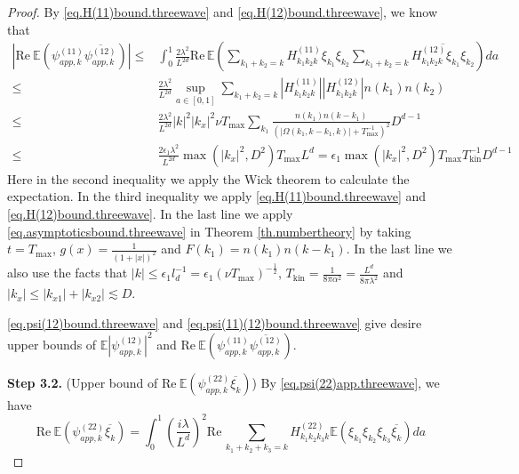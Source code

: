 \begin{proof}
By \eqref{eq.H(11)bound.threewave} and \eqref{eq.H(12)bound.threewave}, we know that 
\begin{equation}\label{eq.psi(11)(12)bound.threewave}
\begin{split}
    \left|\text{Re}\ \mathbb E \left(\psi^{(11)}_{app,k}\overline{\psi^{(12)}_{app,k}}\right)\right|
    \le& \int^1_{0}\frac{2\lambda^2}{L^{2d}} \text{Re}\,\mathbb E\left(\sum\limits_{k_1+k_2=k} H^{(11)}_{k_1k_2k}\xi_{k_1} \xi_{k_2}  \sum\limits_{k_1+k_2=k} \overline{H^{(12)}_{k_1k_2k}\xi_{k_1} \xi_{k_2}}\right) da 
    \\
    \le& \frac{2\lambda^2}{L^{2d}} \sup_{a\in[0,1]}\sum\limits_{k_1+k_2=k} \left|H^{(11)}_{k_1k_2k}\right|\left|H^{(12)}_{k_1k_2k}\right|n(k_1) n(k_2)
    \\
    \le& \frac{2\lambda^2}{L^{2d}} |k|^2|k_x|^2\nu T_{\text{max}} \sum\limits_{k_1} \frac{n(k_1) n(k-k_1)}{(|\Omega(k_1,k-k_1,k)|+T^{-1}_{\text{max}})^2}D^{d-1}
    \\
    \le& \frac{2\epsilon_1\lambda^2}{L^{2d}} \max(|k_x|^2,D^2) T_{\text{max}} L^d=\epsilon_1 \max(|k_x|^2,D^2) T_{\text{max}} T^{-1}_{\text{kin}} D^{d-1}
\end{split}   
\end{equation}
Here in the second inequality we apply the Wick theorem to calculate the expectation. In the third inequality we apply \eqref{eq.H(11)bound.threewave} and \eqref{eq.H(12)bound.threewave}. In the last line we apply \eqref{eq.asymptoticsbound.threewave} in Theorem \ref{th.numbertheory} by taking $t=T_{\text{max}}$, $g(x)=\frac{1}{(1+|x|)^2}$ and $F(k_1)=n(k_1) n(k-k_1)$. In the last line we also use the facts that $|k|\le \epsilon_1 l_{d}^{-1}=\epsilon_1 (\nu T_{\text{max}})^{-\frac{1}{2}}$, $T_{\text{kin}}=\frac{1}{8\pi\alpha^2}=\frac{L^{d}}{8\pi\lambda^2}$ and $|k_x|\le |k_{x1}|+|k_{x2}|\lesssim D$.

\eqref{eq.psi(12)bound.threewave} and \eqref{eq.psi(11)(12)bound.threewave} give desire upper bounds of $\mathbb E \left|\psi^{(12)}_{app,k}\right|^2$ and $\text{Re}\ \mathbb E \left(\psi^{(11)}_{app,k}\overline{\psi^{(12)}_{app,k}}\right)$.




\textbf{Step 3.2.} (Upper bound of $\text{Re}\  \mathbb E \left(\psi^{(22)}_{app,k}\overline{\xi_k}\right)$) By \eqref{eq.psi(22)app.threewave}, we have 
\begin{equation}
\text{Re}\  \mathbb E \left(\psi^{(22)}_{app,k}\overline{\xi_k}\right)=\int^1_{0}\left(\frac{i\lambda}{L^{d}}\right)^2 \text{Re}\,\sum\limits_{k_1+k_2+k_3=k} H^{(22)}_{k_1k_2k_3k}\mathbb E\left(\xi_{k_1} \xi_{k_2}\xi_{k_3}\overline{\xi_k}\right) da 
\end{equation}


\end{proof}
